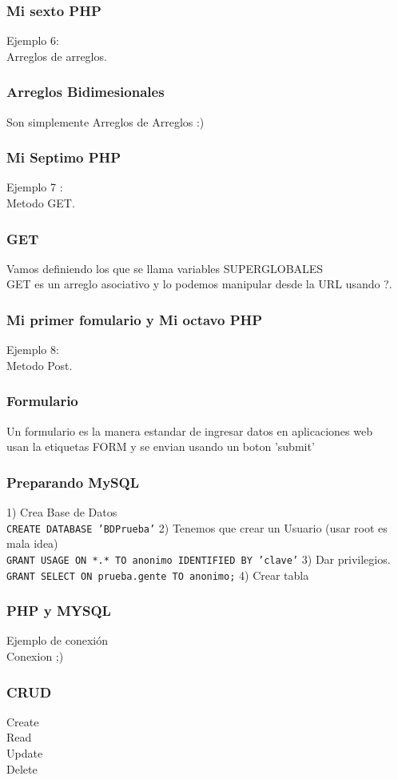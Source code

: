 \documentclass[]{beamer}
\begin{document}
\begin{frame}\frametitle{Mi sexto PHP}
Ejemplo 6: \\
Arreglos de arreglos. \\
\end{frame}

\begin{frame}\frametitle{Arreglos Bidimesionales}
Son simplemente Arreglos de Arreglos :) \\
\end{frame}

\begin{frame}\frametitle{Mi Septimo PHP}
Ejemplo 7 : \\
Metodo GET. \\
\end{frame}

\begin{frame}\frametitle{GET}
Vamos definiendo los que se llama variables SUPERGLOBALES \\
GET es un arreglo asociativo y lo podemos manipular desde la URL usando ?. \\
\end{frame}

\begin{frame}\frametitle{Mi primer fomulario y Mi octavo PHP}
Ejemplo 8: \\
Metodo Post. \\
\end{frame}

\begin{frame}\frametitle{Formulario}
Un formulario es la manera estandar de ingresar datos en aplicaciones web \\
usan la etiquetas FORM y se envian usando un boton 'submit' \\
\end{frame}

\begin{frame}\frametitle{Preparando MySQL}
1) Crea Base de Datos \\
\texttt{CREATE DATABASE 'BDPrueba'}
2) Tenemos que crear un Usuario (usar root es mala idea)\\
\texttt{GRANT USAGE ON *.* TO anonimo IDENTIFIED BY 'clave'}
3) Dar privilegios.\\
\texttt{GRANT SELECT ON prueba.gente TO anonimo;}
4) Crear tabla \\
\end{frame}

\begin{frame}\frametitle{PHP y MYSQL}
Ejemplo de conexión\\
Conexion ;)\\
\end{frame}

\begin{frame}\frametitle{CRUD}
Create \\
Read \\
Update \\
Delete \\
\end{frame}
\end{document}
